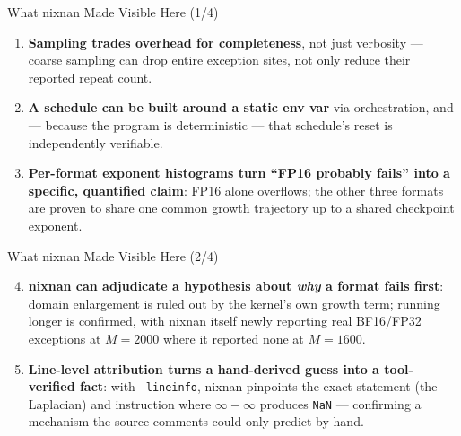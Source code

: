 \documentclass{beamer}
\begin{document}
\begin{frame}{What nixnan Made Visible Here (1/4)}
\begin{enumerate}
  \item \textbf{Sampling trades overhead for completeness}, not just
    verbosity --- coarse sampling can drop entire exception sites, not
    only reduce their reported repeat count.
  \item \textbf{A schedule can be built around a static env var} via
    orchestration, and --- because the program is deterministic --- that
    schedule's reset is independently verifiable.
  \item \textbf{Per-format exponent histograms turn ``FP16 probably fails''
    into a specific, quantified claim}: FP16 alone overflows; the other
    three formats are proven to share one common growth trajectory up to
    a shared checkpoint exponent.
\end{enumerate}
\end{frame}

\begin{frame}{What nixnan Made Visible Here (2/4)}
\begin{enumerate}
\setcounter{enumi}{3}
  \item \textbf{nixnan can adjudicate a hypothesis about \emph{why} a format
    fails first}: domain enlargement is ruled out by the kernel's own growth
    term; running longer is confirmed, with nixnan itself newly reporting
    real BF16/FP32 exceptions at $M{=}2000$ where it reported none at
    $M{=}1600$.
  \item \textbf{Line-level attribution turns a hand-derived guess into a
    tool-verified fact}: with \texttt{-lineinfo}, nixnan pinpoints the exact
    statement (the Laplacian) and instruction where $\infty-\infty$ produces
    \texttt{NaN} --- confirming a mechanism the source comments could only
    predict by hand.
\end{enumerate}
\end{frame}
\end{document}
